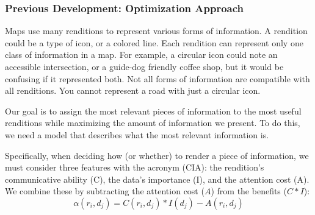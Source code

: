 \subsubsection{Previous Development: Optimization Approach}
Maps use many renditions to represent various forms of information. A  rendition could be a type of icon, or a colored line. Each rendition can represent only one class of information in a map. For example, a circular icon could note an accessible intersection, or a guide-dog friendly coffee shop, but it would be confusing if it represented both. Not all forms of information are compatible with all renditions. You cannot represent a road with just a circular icon. 

Our goal is to assign the most relevant pieces of information to the most useful renditions while maximizing the amount of information we present.  To do this, we need a model that describes what the most relevant information is.



Specifically, when deciding how (or whether) to render a piece of information, we must consider three features with the acronym (CIA): the rendition's communicative ability (C), the data's importance (I), and the attention cost (A).
We combine these by subtracting the attention cost ($A$)  from the benefits ($C*I$): 
\begin{equation}
\label{eq::CIA}
\alpha(r_i, d_j) = C(r_i, d_j)*I(d_j)-A(r_i, d_j)
\end{equation}

